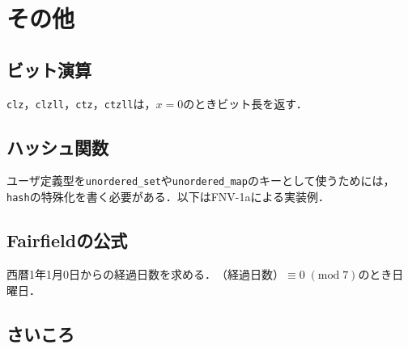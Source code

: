 \documentclass[landscape,twocolumn,9pt]{jsarticle}
\begin{document}
\section{その他}%
\subsection{ビット演算}
\texttt{clz}，\texttt{clzll}，\texttt{ctz}，\texttt{ctzll}は，$x=0$のときビット長を返す．


\subsection{ハッシュ関数}
ユーザ定義型を\texttt{unordered\_set}や\texttt{unordered\_map}のキーとして使うためには，
\texttt{hash}の特殊化を書く必要がある．以下はFNV-1aによる実装例．


\subsection{Fairfieldの公式}
西暦1年1月0日からの経過日数を求める．$\text{（経過日数）}\equiv 0\; (\mathrm{mod}\; 7)$のとき日曜日．


\subsection{さいころ}

\end{document}
